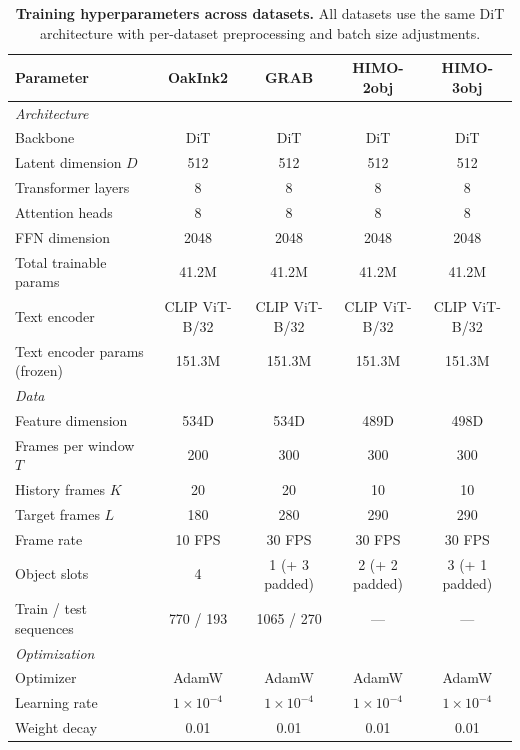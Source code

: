 \documentclass[sigconf, screen, review, anonymous]{acmart}
\begin{document}
\begin{table}[t]
  \caption{\textbf{Training hyperparameters across datasets.} All datasets use the same DiT architecture with per-dataset preprocessing and batch size adjustments.}
  \label{tab:hyperparams}
  \centering
  \small
  \begin{tabular}{@{}lcccc@{}}
    \toprule
    Parameter & OakInk2 & GRAB & HIMO-2obj & HIMO-3obj \\
    \midrule
    \multicolumn{5}{l}{\textit{Architecture}} \\
    \quad Backbone & DiT & DiT & DiT & DiT \\
    \quad Latent dimension $D$ & 512 & 512 & 512 & 512 \\
    \quad Transformer layers & 8 & 8 & 8 & 8 \\
    \quad Attention heads & 8 & 8 & 8 & 8 \\
    \quad FFN dimension & 2048 & 2048 & 2048 & 2048 \\
    \quad Total trainable params & 41.2M & 41.2M & 41.2M & 41.2M \\
    \quad Text encoder & CLIP ViT-B/32 & CLIP ViT-B/32 & CLIP ViT-B/32 & CLIP ViT-B/32 \\
    \quad Text encoder params (frozen) & 151.3M & 151.3M & 151.3M & 151.3M \\
    \midrule
    \multicolumn{5}{l}{\textit{Data}} \\
    \quad Feature dimension & 534D & 534D & 489D & 498D \\
    \quad Frames per window $T$ & 200 & 300 & 300 & 300 \\
    \quad History frames $K$ & 20 & 20 & 10 & 10 \\
    \quad Target frames $L$ & 180 & 280 & 290 & 290 \\
    \quad Frame rate & 10 FPS & 30 FPS & 30 FPS & 30 FPS \\
    \quad Object slots & 4 & 1 (+ 3 padded) & 2 (+ 2 padded) & 3 (+ 1 padded) \\
    \quad Train / test sequences & 770 / 193 & 1065 / 270 & --- & --- \\
    \midrule
    \multicolumn{5}{l}{\textit{Optimization}} \\
    \quad Optimizer & AdamW & AdamW & AdamW & AdamW \\
    \quad Learning rate & $1 \times 10^{-4}$ & $1 \times 10^{-4}$ & $1 \times 10^{-4}$ & $1 \times 10^{-4}$ \\
    \quad Weight decay & 0.01 & 0.01 & 0.01 & 0.01 \\

\end{tabular}
\end{table}
\end{document}

